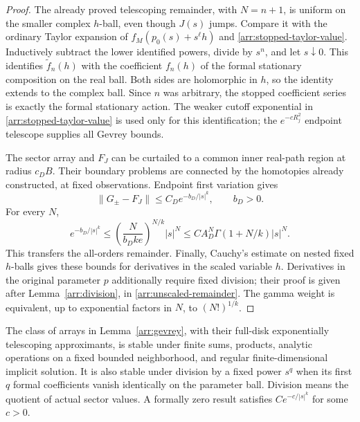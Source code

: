 \begin{proof}
The already proved telescoping remainder, with $N=n+1$, is uniform
on the smaller complex $h$-ball, even though $J(s)$ jumps.  Compare it
with the ordinary Taylor expansion of $f_M(p_0(s)+s^\ell h)$ and
\eqref{arr:stopped-taylor-value}.  Inductively subtract the lower
identified powers, divide by $s^n$, and let $s\downarrow0$.
This identifies $\widetilde f_n(h)$ with the coefficient $f_n(h)$ of
the formal stationary composition on the real ball.  Both sides are
holomorphic in $h$, so the identity extends to the complex ball.
Since $n$ was arbitrary, the stopped coefficient series is exactly
the formal stationary action.  The weaker cutoff exponential in
\eqref{arr:stopped-taylor-value} is used only for this identification;
the $e^{-cR_j^2}$ endpoint telescope supplies all Gevrey bounds.

The sector array and \(F_J\) can be curtailed to a common
inner real-path region at radius \(c_DB\).
Their boundary problems are connected by the homotopies
already constructed, at fixed observations.
Endpoint first variation gives
\[
 \|G_\pm-F_J\|\le C_D e^{-b_D/|s|^k},\qquad b_D>0.
\]
For every \(N\),
\[
 e^{-b_D/|s|^k}
 \le \left(\frac{N}{b_Dke}\right)^{N/k}|s|^N
 \le C A_D^N\Gamma(1+N/k)|s|^N .
\]
This transfers the all-orders remainder.
Finally, Cauchy's estimate on nested fixed \(h\)-balls gives these
bounds for derivatives in the scaled variable \(h\).
Derivatives in the original parameter \(p\) additionally require
fixed division; their proof is given after Lemma~\ref{arr:division},
in \eqref{arr:unscaled-remainder}.
The gamma weight is equivalent, up to exponential factors in \(N\),
to \((N!)^{1/k}\).
\end{proof}

\begin{lemma}
\label{arr:division}
The class of arrays in Lemma~\ref{arr:gevrey}, with their
full-disk exponentially telescoping approximants, is stable
under finite sums, products, analytic operations on a fixed
bounded neighborhood, and regular finite-dimensional implicit
solution.  It is also stable under division by a fixed power
\(s^q\) when its first \(q\) formal coefficients vanish
identically on the parameter ball.  Division means the
quotient of actual sector values.
A formally zero result satisfies \(Ce^{-c/|s|^k}\) for
some \(c>0\).
\end{lemma}

